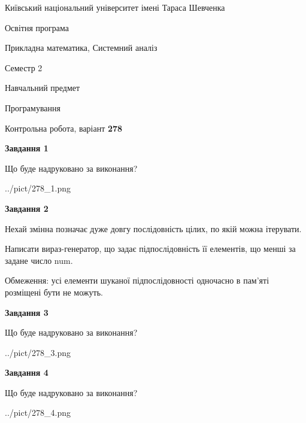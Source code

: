 \documentclass[12pt, ukrainian]{article}
\begin{document}
{{\begin {small}\par
{ \center  Київський національний університет імені Тараса Шевченка \par}
{\parbox {5 cm}{Освітня програма \hfill}{\parbox {8 cm}{Прикладна математика, Системний аналіз \hfill}}\parbox {5 cm}{\hfill Семестр 2}}\par
{\parbox {5 cm} {Навчальний предмет \hfill}\parbox {7 cm}{Програмування \hfill}\parbox {6cm}{\hfill}\par}\vspace{-7pt} \end{small}}{\center Контрольна робота, варіант  \No \textbf
{ 278 }\par}}
{
\begin {large}
{\begin {center}\textbf{Завдання 1}\end {center}}\par
Що буде надруковано за виконання?\par\par
\begin{center}
	{../pict/278_1.png}
\end{center}
\newpage

{\begin {center}\textbf{Завдання 2}\end {center}}\par
Нехай змінна  позначає дуже довгу послідовність цілих, по якій можна ітерувати.

Написати вираз-генератор, що задає підпослідовність її елементів, що менші за задане число num.

Обмеження: усі елементи шуканої підпослідовності одночасно в пам'яті розміщені бути не можуть.\par
\newpage

{\begin {center}\textbf{Завдання 3}\end {center}}\par
Що буде надруковано за виконання?\par
\begin{center}
	{../pict/278_3.png}
\end{center}
\newpage

{\begin {center}\textbf{Завдання 4}\end {center}}\par
Що буде надруковано за виконання?\par
\begin{center}
	{../pict/278_4.png}
\end{center}
\newpage


\end{large}}
\end{document}
